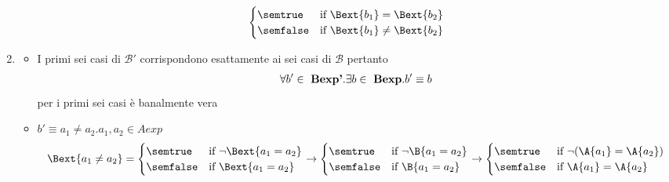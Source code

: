 \begin{enumerate}[label=(\alph*)]
\begin{align*}
\begin{cases}
  \semtrue & 
  \mbox{if} \ \Bext{b_1} = \Bext{b_2}\\
  \semfalse & 
  \mbox{if} \ \Bext{b_1} \neq \Bext{b_2}\\        
  \end{cases} 
\end{align*}
\item
  \begin{itemize}
    \item I primi sei casi di $\mathcal{B'}$ corrispondono esattamente ai sei 
casi di $\mathcal{B}$ pertanto 
      \begin{align*}
        \forall b' \in \ \mbox{\textbf{Bexp'}}.\exists b \in 
        \ \mbox{\textbf{Bexp}}.b' \equiv b
      \end{align*}
      per i primi sei casi è banalmente vera
    \item $b' \equiv a_1 \neq a_2. a_1, a_2 \in Aexp$ \\ 
      \begin{align*}
        \Bext{a_1 \neq a_2} = 
        \begin{cases} 
          \semtrue & 
          \mbox{if} \ \lnot \Bext{a_1 = a_2} \\ 
          \semfalse & 
          \mbox{if}  \ \Bext{a_1 = a_2}\\
        \end{cases}
        \rightarrow
        \begin{cases} 
          \semtrue & 
          \mbox{if} \ \lnot \B{a_1 = a_2} \\ 
          \semfalse & 
          \mbox{if}  \ \B{a_1 = a_2}\\
        \end{cases}
        \rightarrow
        \begin{cases} 
          \semtrue & 
          \mbox{if} \ \lnot (\A{a_1} = \A{a_2}) \\ 
          \semfalse & 
          \mbox{if}  \ \A{a_1} = \A{a_2}\\
        \end{cases} 
      \end{align*}
    

\end{itemize}
\end{enumerate}
